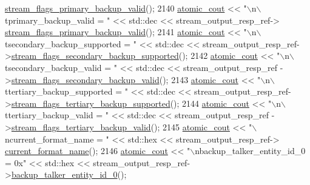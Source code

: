 \begin{DoxyCode}
      \hyperlink{classavdecc__lib_1_1stream__output__descriptor__response_a35e1c2d08ac6d699e575f3ba118ef0f7}{stream\_flags\_primary\_backup\_valid}();
2140             \hyperlink{cmd__line_8h_a0bc38ccc65c79ba06c6fcd7b4bf554c3}{atomic\_cout} << \textcolor{stringliteral}{"\(\backslash\)n\(\backslash\)tprimary\_backup\_valid = "} << std::dec << stream\_output\_resp\_ref->
      \hyperlink{classavdecc__lib_1_1stream__output__descriptor__response_a35e1c2d08ac6d699e575f3ba118ef0f7}{stream\_flags\_primary\_backup\_valid}();
2141             \hyperlink{cmd__line_8h_a0bc38ccc65c79ba06c6fcd7b4bf554c3}{atomic\_cout} << \textcolor{stringliteral}{"\(\backslash\)n\(\backslash\)tsecondary\_backup\_supported = "} << std::dec << 
      stream\_output\_resp\_ref->\hyperlink{classavdecc__lib_1_1stream__output__descriptor__response_acb3e666eaff1f1303ba9c2733aee3d52}{stream\_flags\_secondary\_backup\_supported}();
2142             \hyperlink{cmd__line_8h_a0bc38ccc65c79ba06c6fcd7b4bf554c3}{atomic\_cout} << \textcolor{stringliteral}{"\(\backslash\)n\(\backslash\)tsecondary\_backup\_valid = "} << std::dec << stream\_output\_resp\_ref
      ->\hyperlink{classavdecc__lib_1_1stream__output__descriptor__response_a83765255f81d93d3bb28eeb9edec8904}{stream\_flags\_secondary\_backup\_valid}();
2143             \hyperlink{cmd__line_8h_a0bc38ccc65c79ba06c6fcd7b4bf554c3}{atomic\_cout} << \textcolor{stringliteral}{"\(\backslash\)n\(\backslash\)ttertiary\_backup\_supported = "} << std::dec << 
      stream\_output\_resp\_ref->\hyperlink{classavdecc__lib_1_1stream__output__descriptor__response_abbd3928cc72f811f32fcb5a079f791b2}{stream\_flags\_tertiary\_backup\_supported}();
2144             \hyperlink{cmd__line_8h_a0bc38ccc65c79ba06c6fcd7b4bf554c3}{atomic\_cout} << \textcolor{stringliteral}{"\(\backslash\)n\(\backslash\)ttertiary\_backup\_valid = "} << std::dec << stream\_output\_resp\_ref
      ->\hyperlink{classavdecc__lib_1_1stream__output__descriptor__response_a430a18cf3301728015f75d8a80676004}{stream\_flags\_tertiary\_backup\_valid}();
2145             \hyperlink{cmd__line_8h_a0bc38ccc65c79ba06c6fcd7b4bf554c3}{atomic\_cout} << \textcolor{stringliteral}{"\(\backslash\)ncurrent\_format\_name = "} << std::hex << stream\_output\_resp\_ref->
      \hyperlink{classavdecc__lib_1_1stream__output__descriptor__response_a24176b56bc0f1873b27d00565bc397c5}{current\_format\_name}();
2146             \hyperlink{cmd__line_8h_a0bc38ccc65c79ba06c6fcd7b4bf554c3}{atomic\_cout} << \textcolor{stringliteral}{"\(\backslash\)nbackup\_talker\_entity\_id\_0 = 0x"} << std::hex << 
      stream\_output\_resp\_ref->\hyperlink{classavdecc__lib_1_1stream__output__descriptor__response_acd4fa01e575dfb7160afc66a7cdffcc6}{backup\_talker\_entity\_id\_0}();

\end{DoxyCode}
